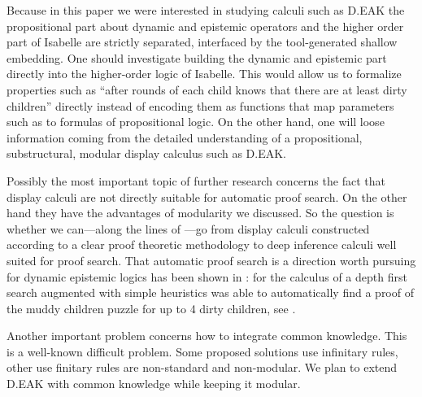 \documentclass[runningheads,a4paper]{llncs}
\begin{document}
\noindent
Because in this paper we were interested in studying calculi such as D.EAK 
the propositional part about dynamic and epistemic operators and the higher order part of Isabelle are strictly separated, interfaced by the tool-generated shallow embedding. One should investigate building the dynamic and epistemic part directly into the higher-order logic of Isabelle. This would allow us to formalize properties such as  ``after  rounds of  each child knows that there are at least  dirty children'' directly instead of encoding them as functions that map parameters such as  to formulas of propositional logic. On the other hand, one will loose information coming from the detailed understanding of a propositional, substructural, modular
display calculus such as D.EAK.

\medskip Possibly the most important topic of further research concerns the fact that display calculi are not directly suitable for automatic proof search. On the other hand they have the advantages of modularity we discussed. So the question is whether we can---along the lines of \cite{GorePT09}---go from display calculi constructed according to a clear proof theoretic methodology to deep inference calculi well suited for proof search. That automatic proof search is a direction worth pursuing for dynamic epistemic logics has been shown in \cite{Truffaut:msc}: for the calculus of \cite{Dyckhoff} a depth first search augmented with simple heuristics was able to automatically find a proof of the muddy children puzzle for up to 4 dirty children, see \cite[.3]{Truffaut:msc}.

\medskip Another important problem concerns how to integrate common knowledge. 
This is a well-known difficult problem. Some proposed solutions use infinitary rules, other use finitary rules are non-standard and non-modular. We plan to extend D.EAK with common knowledge while keeping it modular.



\newpage

\end{document}
